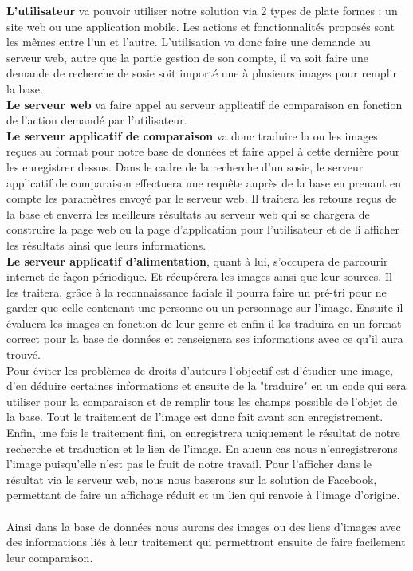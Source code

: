\documentclass[a4paper,12pt]{article}
\begin{document}
\textbf{L'utilisateur} va pouvoir utiliser notre solution via 2 types de plate formes : un site web ou une application mobile. Les actions et fonctionnalités proposés sont les mêmes entre l'un et l'autre. L'utilisation va donc faire une demande au serveur web, autre que la partie gestion de son compte, il va soit faire une demande de recherche de sosie soit importé une à plusieurs images pour remplir la base. \\ \textbf{Le serveur web} va faire appel au serveur applicatif de comparaison en fonction de l'action demandé par l'utilisateur. \\ \textbf{Le serveur applicatif de comparaison} va donc traduire la ou les images reçues au format pour notre base de données et faire appel à cette dernière pour les enregistrer dessus. Dans le cadre de la recherche d'un sosie, le serveur applicatif de comparaison effectuera une requête auprès de la base en prenant en compte les paramètres envoyé par le serveur web. Il traitera les retours reçus de la base et enverra les meilleurs résultats au serveur web qui se chargera de construire la page web ou la page d'application pour l'utilisateur et de li afficher les résultats ainsi que leurs informations. 
\\ \textbf{Le serveur applicatif d'alimentation}, quant à lui, s'occupera de parcourir internet de façon périodique. Et récupérera les images ainsi que leur sources. Il les traitera, grâce à la reconnaissance faciale il pourra faire un pré-tri pour ne garder que celle contenant une personne ou un personnage sur l'image. Ensuite il évaluera les images en fonction de leur genre et enfin il les traduira en un format correct pour la base de données et renseignera ses informations avec ce qu'il aura trouvé. \\ Pour éviter les problèmes de droits d'auteurs l'objectif est d'étudier une image, d'en déduire certaines informations et ensuite de la "traduire" en un code qui sera utiliser pour la comparaison et de remplir tous les champs possible de l'objet de la base. Tout le traitement de l'image est donc fait avant son enregistrement. Enfin, une fois le traitement fini, on enregistrera uniquement le résultat de notre recherche et traduction et le lien de l'image. En aucun cas nous n'enregistrerons l'image puisqu'elle n'est pas le fruit de notre travail. Pour l'afficher dans le résultat via le serveur web, nous nous baserons sur la solution de Facebook, permettant de faire un affichage réduit et un lien qui renvoie à l'image d'origine. 
\\ \\ 
Ainsi dans la base de données nous aurons des images ou des liens d'images avec des informations liés à leur traitement qui permettront ensuite de faire facilement leur comparaison. 
\end{document}
